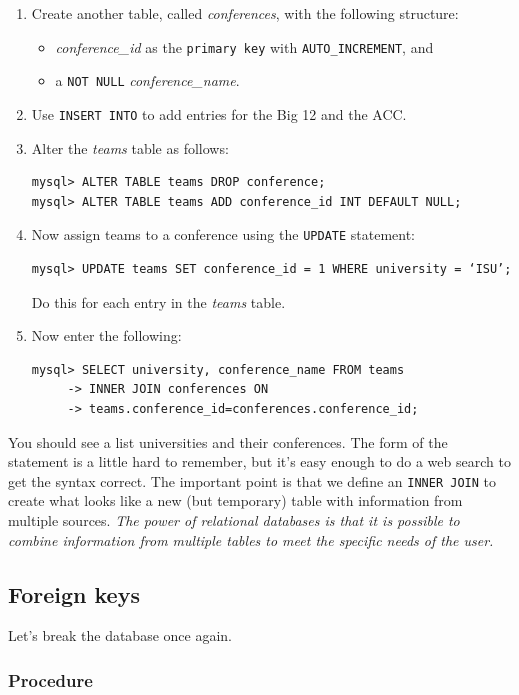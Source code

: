 \documentclass[11pt]{article} %
\begin{document}
\begin{enumerate}
\item Create another table, called \emph{conferences}, with the following structure:
\begin{itemize}
\item \emph{conference\_id} as the \verb|primary key| with \verb|AUTO_INCREMENT|, and
\item a \verb|NOT NULL| \emph{conference\_name}.
\end{itemize}
\item Use \verb|INSERT INTO| to add entries for the Big 12 and the ACC.
\item Alter the \emph{teams} table as follows:
\begin{verbatim}
mysql> ALTER TABLE teams DROP conference;
mysql> ALTER TABLE teams ADD conference_id INT DEFAULT NULL;
\end{verbatim}
\item Now assign teams to a conference using the \verb|UPDATE| statement:
\begin{verbatim}
mysql> UPDATE teams SET conference_id = 1 WHERE university = ‘ISU’;
\end{verbatim}
Do this for each entry in the \emph{teams} table.
\item Now enter the following:

\begin{verbatim}
mysql> SELECT university, conference_name FROM teams
     -> INNER JOIN conferences ON
     -> teams.conference_id=conferences.conference_id;
\end{verbatim}
\end{enumerate}

You should see a list universities and their conferences. The form of the statement is a little hard to remember, but it’s easy enough to do a web search to get the syntax correct. The important point is that we define an \verb|INNER JOIN| to create what looks like a new (but temporary) table with information from multiple sources. \emph{The power of relational databases is that it is possible to combine information from multiple tables to meet the specific needs of the user.}

\subsection*{Foreign keys}

Let’s break the database once again.

\subsubsection*{Procedure}
\end{document}
